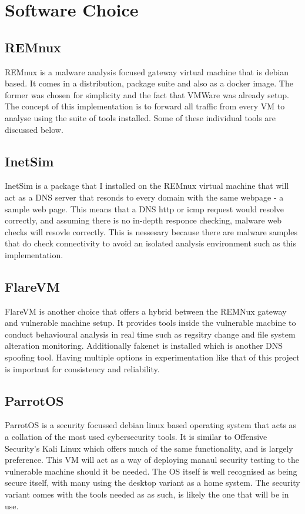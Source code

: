 
\section{Software Choice}
\subsection{REMnux}
REMnux is a malware analysis focused gateway virtual machine that is debian based. It comes in a distribution, package suite and also as a docker image. The former was chosen for simplicity and the fact that VMWare was already setup. The concept of this implementation is to
forward all traffic from every VM to analyse using the suite of tools installed. Some of these individual tools are discussed below.
\subsection{InetSim}
InetSim is a package that I installed on the REMnux virtual machine that will act as a DNS server that resonds to every domain with the same webpage - a sample web page. This means that a DNS http or icmp request would resolve correctly, and assuming there is no in-depth responce checking, malware web checks will resovle correctly. 
This is nessesary because there are malware samples that do check connectivity to avoid an isolated analysis environment such as this implementation.
\subsection{FlareVM} 
FlareVM is another choice that offers a hybrid between the REMNux gateway and vulnerable machine setup. It provides tools inside the vulnerable macbine to conduct behavioural analysis in real time such as regsitry change and file system alteration monitoring. Additionally fakenet is installed which is another DNS spoofing tool. Having multiple options in experimentation like that of this project is important for consistency and reliability. 
\subsection{ParrotOS}
ParrotOS is a security focussed debian linux based operating system that acts as a collation of the most used cybersecurity tools. It is similar to Offensive Security's Kali Linux which offers much of the same functionality, and is largely preference. This VM will act as a way of deploying manaul security testing to the vulnerable machine should it be needed. The OS itself is well recognised as being secure itself, with many using the desktop variant as a home system. The security variant comes with the tools needed as as such, is likely the one that will be in use.

